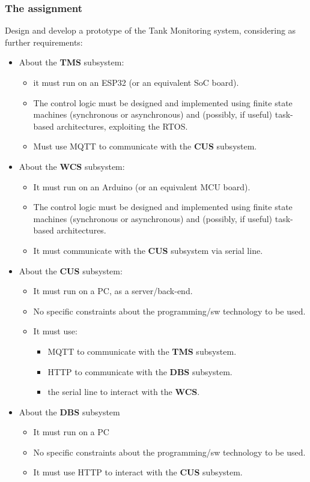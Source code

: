 \documentclass[12pt, letterpaper, twoside]{article}
\begin{document}
\subsubsection*{The assignment}

Design and develop a prototype of the Tank Monitoring system, considering as further  requirements:
\begin{itemize}
    \item About the \textbf{TMS} subsystem:
    \begin{itemize}
        \item it must run on an ESP32 (or an equivalent SoC board).
        \item The control logic must be designed and implemented using finite state machines (synchronous or asynchronous) and (possibly, if useful) task-based architectures, exploiting the RTOS.
        \item Must use MQTT to communicate with the \textbf{CUS} subsystem.
    \end{itemize}
    \item About the \textbf{WCS} subsystem:
    \begin{itemize}
        \item It must run on an Arduino (or an equivalent MCU board).
        \item The control logic must be designed and implemented using finite state machines (synchronous or asynchronous) and  (possibly, if useful) task-based architectures.
        \item It must communicate with the \textbf{CUS} subsystem via serial line.
    \end{itemize}
    \item About the \textbf{CUS} subsystem: 
    \begin{itemize}
        \item It must run on a PC, as a server/back-end.
        \item No specific constraints about the programming/sw technology to be used.
        \item It must use:
        \begin{itemize}
            \item MQTT to communicate with the \textbf{TMS} subsystem.
            \item HTTP to communicate  with the \textbf{DBS} subsystem. 
            \item the serial line to interact with the \textbf{WCS}.
        \end{itemize}
    \end{itemize}
    \item About the \textbf{DBS} subsystem
    \begin{itemize}
        \item It must run on a PC
        \item No specific constraints about the programming/sw technology to be used.
        \item It must use HTTP to interact with the \textbf{CUS} subsystem.
    \end{itemize}
\end{itemize}
\end{document}
